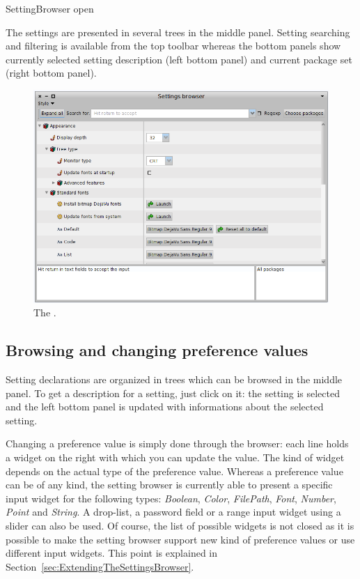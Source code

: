 \documentclass[a4paper,10pt,twoside]{book}
\begin{document}
\begin{code}{}
SettingBrowser open
\end{code}
The settings are presented in several trees in the middle panel. Setting searching and filtering is available from the top toolbar whereas the bottom panels show currently selected setting description (left bottom panel) and current package set (right bottom panel). 
\begin{figure}[tbh]
\begin{center}
\includegraphics[scale=0.3]{SettingBrowser}
\caption{The \setbrowser.}
\end{center}
\end{figure}

\subsection{Browsing and changing preference values}
\label{sec:browsing-settings}
Setting declarations are organized in trees which can be browsed in the middle panel. To get a description for a setting, just click on it: the setting is selected and the left bottom panel is updated with informations about the selected setting. 

Changing a  preference value is simply done through the browser: each line holds a widget on the right with which you can update the value. The kind of widget depends on the actual type of the preference value. Whereas a preference value can be of any kind, the setting browser is currently able to present a specific input widget for the following types: \textit{Boolean}, \textit{Color}, \textit{FilePath}, \textit{Font}, \textit{Number}, \textit{Point} and \textit{String}. A drop-list, a password field or a range input widget using a slider can also be used. Of course, the list of possible widgets is not closed as it is possible to make the setting browser support new kind of preference values or use different input widgets. This point is explained in Section~\ref{sec:ExtendingTheSettingsBrowser}.
\end{document}
